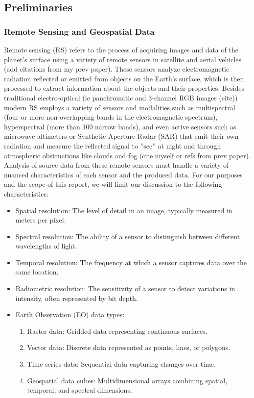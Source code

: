 \begin{multicols}{2}
\subsection{Preliminaries}

\subsubsection{Remote Sensing and Geospatial Data}

Remote sensing (RS) refers to the process of acquiring images and data of the planet’s surface using a variety of remote sensors in satellite and aerial vehicles (add citations from my prev paper). 
These sensors analyze electromagnetic radiation reflected or emitted from objects on the Earth’s surface, which is then processed to extract information about the objects and their properties. 
Besides traditional electro-optical (ie panchromatic and 3-channel RGB images (cite)) modern RS employs a variety of sensors and modalities such as multispectral 
(four or more non-overlapping bands in the electromagnetic spectrum), hyperspectral (more than 100 narrow bands), and even active sensors such as microwave altimeters or Synthetic
Aperture Radar (SAR) that emit their own radiation and measure the reflected signal to ”see” at night and through atmospheric obstructions like clouds and fog (cite myself or refs from prev paper). 
Analysis of source data from these remote sensors must handle a variety of nuanced characteristics of each sensor and the produced data. For our purposes and the scope of this report, we will limit our discussion
to the following characteristics: 

\begin{itemize}
    \item Spatial resolution: The level of detail in an image, typically measured in meters per pixel.
    \item Spectral resolution: The ability of a sensor to distinguish between different wavelengths of light.
    \item Temporal resolution: The frequency at which a sensor captures data over the same location.
    \item Radiometric resolution: The sensitivity of a sensor to detect variations in intensity, often represented by bit depth.
    \item Earth Observation (EO) data types:
        \begin{enumerate}
            \item Raster data: Gridded data representing continuous surfaces.
            \item Vector data: Discrete data represented as points, lines, or polygons.
            \item Time series data: Sequential data capturing changes over time.
            \item Geospatial data cubes: Multidimensional arrays combining spatial, temporal, and spectral dimensions.
        \end{enumerate}
\end{itemize}


\end{multicols}
